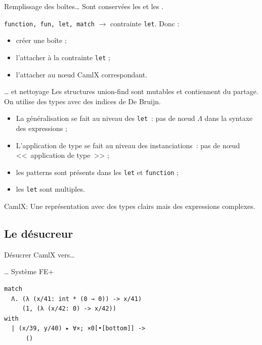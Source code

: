 \documentclass[final]{beamer}
\begin{document}
\begin{frame}{Remplissage des boîtes…}
  Sont conservées les \underline{} et les
  \underline{}.

  \begin{center}
  \end{center}

  \texttt{function, fun, let, match} $\to$ contrainte \texttt{let}. Donc :
  \begin{itemize}
    \item créer une boîte ;
    \item l'attacher à la contrainte \texttt{let} ;
    \item l'attacher au nœud CamlX correspondant.
  \end{itemize}
\end{frame}

\begin{frame}{… et nettoyage}
 Les structures union-find sont mutables et contiennent du partage. On utilise
 des types avec des indices de De Bruijn.

 \begin{itemize}
   \item La généralisation se fait au niveau des \texttt{let}~: pas de nœud
     $\Lambda$ dans la syntaxe des expressions ;
   \item L'application de type se fait au niveau des instanciations~: pas de
     nœud <<~application de type~>> ;
   \item les patterns sont présents dans les \texttt{let} et \texttt{function} ;
   \item les \texttt{let} sont multiples.
 \end{itemize}

 \begin{block}{CamlX:}
 Une représentation avec des types clairs mais des expressions complexes.
 \end{block}
\end{frame}

\subsection{Le désucreur}

\begin{frame}[fragile]{Désucrer CamlX vers…}

… Système FE+

  \begin{verbatim}
match
  Λ. (λ (x/41: int * (0 → 0)) -> x/41)
     (1, (λ (x/42: 0) -> x/42))
with
  | (x/39, y/40) ▸ ∀×; ×0[•[bottom]] ->
      ()
  \end{verbatim}

\end{frame}
\end{document}
